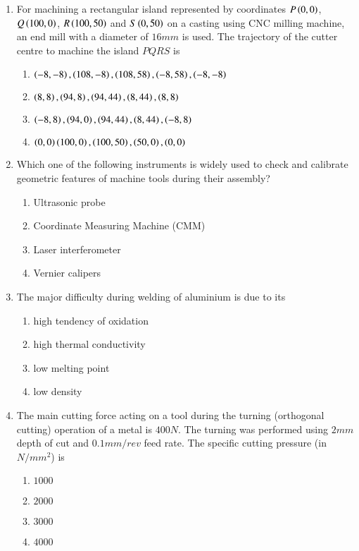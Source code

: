 \documentclass[journal]{IEEEtran}
\begin{document}
\begin{enumerate}
\item For machining a rectangular island represented by coordinates $P\left(0,0\right)$, $Q\left(100,0\right)$, $R\left(100,50\right)$ and $S\left(0,50\right)$ on a casting using CNC milling machine, an end mill with a diameter of $16mm$ is used. The trajectory of the cutter centre to machine the island $PQRS$ is
\begin{enumerate}
\item $\left(-8,-8\right),\left(108,-8\right),\left(108,58\right),\left(-8,58\right),\left(-8,-8\right)$
\item $\left(8,8\right),\left(94,8\right),\left(94,44\right),\left(8,44\right),\left(8,8\right)$
\item $\left(-8,8\right),\left(94,0\right),\left(94,44\right),\left(8,44\right),\left(-8,8\right)$
\item $\left(0,0\right)\left(100,0\right),\left(100,50\right),\left(50,0\right),\left(0,0\right)$
\end{enumerate}

\item Which one of the following instruments is widely used to check and calibrate geometric features of machine tools during their assembly?
\begin{enumerate}
\item Ultrasonic probe
\item Coordinate Measuring Machine (CMM)
\item Laser interferometer
\item Vernier calipers
\end{enumerate}


\item The major difficulty during welding of aluminium is due to its
\begin{multicols}{2}
\begin{enumerate}
\item high tendency of oxidation
\item high thermal conductivity
\item low melting point
\item low density
\end{enumerate}
\end{multicols}


\item The main cutting force acting on a tool during the turning (orthogonal cutting) operation of a metal is $400N$. The turning was performed using $2mm$ depth of cut and $0.1mm/rev$ feed rate. The specific cutting pressure (in $N/mm^{2}$) is
\begin{multicols}{2}
\begin{enumerate}
\item $1000$
\item $2000$
\item $3000$
\item $4000$
\end{enumerate}
\end{multicols}



\end{enumerate}
\end{document}
